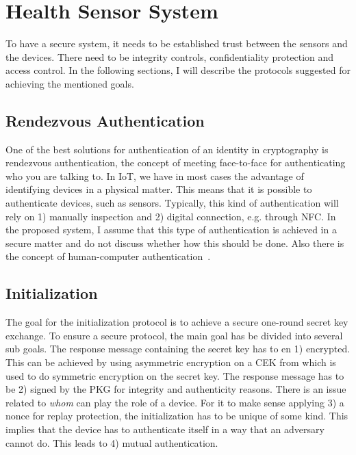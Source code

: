 \section{Health Sensor System}\label{hss}
To have a secure system, it needs to be established trust between the sensors and the devices.
There need to be integrity controls, confidentiality protection and access control. 
In the following sections, I will describe the protocols suggested for achieving the mentioned goals.

\subsection{Rendezvous Authentication}\label{rendezvous_authentication}
One of the best solutions for authentication of an identity in cryptography is rendezvous authentication, the concept of meeting face-to-face for authenticating who you are talking to. 
In \gls{IoT}, we have in most cases the advantage of identifying devices in a physical matter.
This means that it is possible to authenticate devices, such as sensors. 
Typically, this kind of authentication will rely on 1) manually inspection and 2) digital connection, e.g. through \gls{NFC}.
In the proposed system, I assume that this type of authentication is achieved in a secure matter and do not discuss whether how this should be done.
Also there is the concept of human-computer authentication~\cite{DBLP:journals/iacr/GilbertRS05, DBLP:conf/crypto/JuelsW05, DBLP:conf/percom/Weis05}.

\subsection{Initialization}\label{init}
The goal for the initialization protocol is to achieve a secure one-round secret key exchange.
To ensure a secure protocol, the main goal has be divided into several sub goals. 
The response message containing the secret key has to en 1) encrypted. 
This can be achieved by using asymmetric encryption on a \gls{CEK} from which is used to do symmetric encryption on the secret key.
The response message has to be 2) signed by the \gls{PKG} for integrity and authenticity reasons.
There is an issue related to \textit{whom} can play the role of a device.
For it to make sense applying 3) a nonce for replay protection, the initialization has to be unique of some kind.
This implies that the device has to authenticate itself in a way that an adversary cannot do.
This leads to 4) mutual authentication. 


